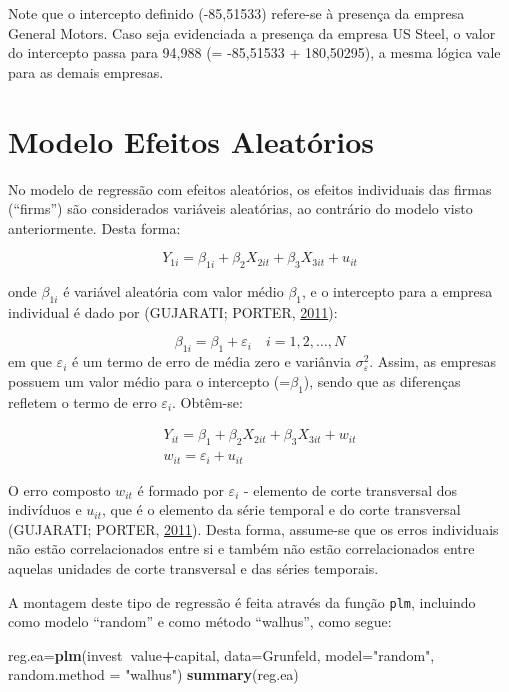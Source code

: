 \documentclass[12pt,brazil,oneside]{book}
\newenvironment{Shaded}{\begin{snugshade}}{\end{snugshade}}
\newcommand{\DataTypeTok}[1]{\textcolor[rgb]{0.13,0.29,0.53}{#1}}
\newcommand{\KeywordTok}[1]{\textcolor[rgb]{0.13,0.29,0.53}{\textbf{#1}}}
\newcommand{\NormalTok}[1]{#1}
\newcommand{\OperatorTok}[1]{\textcolor[rgb]{0.81,0.36,0.00}{\textbf{#1}}}
\newcommand{\StringTok}[1]{\textcolor[rgb]{0.31,0.60,0.02}{#1}}
\begin{document}
Note que o intercepto definido (-85,51533) refere-se à presença da empresa General Motors. Caso seja evidenciada a presença da empresa US Steel, o valor do intercepto passa para 94,988 (= -85,51533 + 180,50295), a mesma lógica vale para as demais empresas.

\hypertarget{modelo-efeitos-aleatorios}{%
\section{Modelo Efeitos Aleatórios}\label{modelo-efeitos-aleatorios}}

No modelo de regressão com efeitos aleatórios, os efeitos individuais das firmas (``firms'') são considerados variáveis aleatórias, ao contrário do modelo visto anteriormente. Desta forma:

\[
Y_{1i}=\beta_{1i}+\beta_2X_{2it}+\beta_3X_{3it}+u_{it}
\]

onde \(\beta_{1i}\) é variável aleatória com valor médio \(\beta_1\), e o intercepto para a empresa individual é dado por (GUJARATI; PORTER, \protect\hyperlink{ref-Gujarati2011}{2011}):

\[
\beta_{1i} = \beta_{1}+\varepsilon_{i} \quad i=1,2,\dots,N
\]
em que \(\varepsilon_{i}\) é um termo de erro de média zero e variânvia \(\sigma^{2}_{\varepsilon}\). Assim, as empresas possuem um valor médio para o intercepto (=\(\beta_1\)), sendo que as diferenças refletem o termo de erro \(\varepsilon_i\). Obtêm-se:

\[
 \begin{matrix}
Y_{it}=\beta_1+\beta_2X_{2it}+\beta_3X_{3it}+ w_{it}\\
w_{it}=\varepsilon_i+u_{it}
 \end{matrix}
\]

O erro composto \(w_{it}\) é formado por \(\varepsilon_i\) - elemento de corte transversal dos indivíduos e \(u_{it}\), que é o elemento da série temporal e do corte transversal (GUJARATI; PORTER, \protect\hyperlink{ref-Gujarati2011}{2011}). Desta forma, assume-se que os erros individuais não estão correlacionados entre si e também não estão correlacionados entre aquelas unidades de corte transversal e das séries temporais.

A montagem deste tipo de regressão é feita através da função \texttt{plm}, incluindo como modelo ``random'' e como método ``walhus'', como segue:

\begin{Shaded}
\begin{Highlighting}[]
\NormalTok{reg.ea=}\KeywordTok{plm}\NormalTok{(invest}\OperatorTok{~}\NormalTok{value}\OperatorTok{+}\NormalTok{capital,}
           \DataTypeTok{data=}\NormalTok{Grunfeld, }\DataTypeTok{model=}\StringTok{"random"}\NormalTok{, }
           \DataTypeTok{random.method =} \StringTok{"walhus"}\NormalTok{)}
\KeywordTok{summary}\NormalTok{(reg.ea)}
\end{Highlighting}
\end{Shaded}
\end{document}
